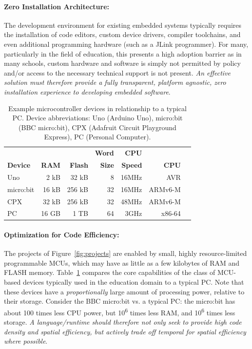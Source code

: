 \paragraph{Zero Installation Architecture:}
The development environment for existing embedded systems typically requires the installation of code editors, custom device drivers, compiler toolchains, and even additional programming hardware (such as a JLink programmer). For many, particularly in the field of education, this presents a high adoption barrier as in many schools, custom hardware and software is simply not permitted by policy and/or access to the necessary technical support is not present. \emph{An effective solution must therefore provide a fully transparent, platform agnostic, zero installation experience to developing embedded software}.

\begin{table}[t]
    \centering
    \begin{tabular}{|l|r|r|r|r|r|r|}
    \hline
                           &          &              & \bf{Word}  & \bf{CPU} &            \\
    \bf{Device}            & \bf{RAM} & \bf{Flash}   & \bf{Size}  & \bf{Speed} & \bf{CPU}  \\ \hline
    Uno            & 2 kB       & 32 kB      & 8          & 16MHz & AVR       \\ \hline
    micro:bit          & 16 kB      & 256 kB     & 32         & 16MHz & ARMv6-M     \\ \hline
    CPX           & 32 kB      & 256 kB     & 32         & 48MHz & ARMv6-M   \\ \hline
    PC             & 16 GB      & 1 TB       & 64         & 3GHz & x86-64      \\ \hline
    \end{tabular}
    \setlength{\textfloatsep}{-10pt}
    \caption{\label{table:devices}Example microcontroller devices in relationship to a typical PC. Device abbreviations: Uno (Arduino Uno), micro:bit (BBC micro:bit), CPX (Adafruit Circuit Playground Express), PC (Personal Computer).}
    \vspace{-20pt}
\end{table}

\paragraph{Optimization for Code Efficiency:}
The projects of Figure~\ref{fig:projects} are enabled by small, highly resource-limited programmable MCUs, which may have as little as a few kilobytes of RAM and FLASH memory.
Table~\ref{table:devices} compares the core capabilities of the class of MCU-based devices typically used in the education domain to a typical PC. Note that these devices have a \emph{proportionally} large amount of processing power, relative to their storage. Consider the BBC micro:bit vs. a typical PC: the micro:bit has about 100 times less CPU power, but 10\textsuperscript{6} times less RAM, and 10\textsuperscript{6} times less storage. \emph{A language/runtime should therefore not only seek to provide high code density and spatial efficiency, but actively trade off temporal for spatial efficiency where possible}.

